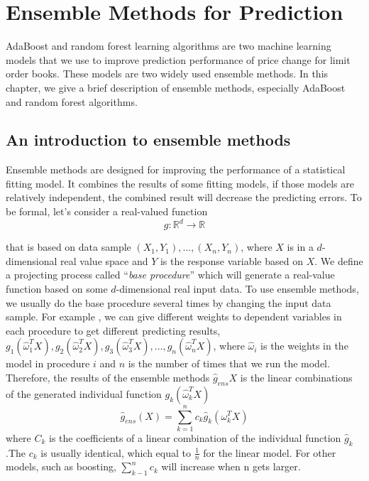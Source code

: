\chapter{Ensemble Methods for Prediction}\label{ch:ensemble}
AdaBoost and random forest learning algorithms are two machine learning models that we use to improve  prediction performance of price change for limit order books. These models are two widely used ensemble methods. In this chapter,  we give a brief description of ensemble methods, especially AdaBoost and random forest algorithms.

\section{An introduction to ensemble methods}
Ensemble methods are designed for improving the performance of a statistical fitting model. It combines the results of some fitting models,  if those models are relatively independent,  the combined result will decrease the predicting errors. 
To be formal,   let's consider a real-valued function 
\begin{equation}
	g:\mathbb{R}^d\rightarrow \mathbb{R}
\end{equation}

that is based on data sample $(X_1, Y_1), ..., (X_n, Y_n)$,  where $X$ is in a $d$-dimensional real value space and $Y$ is the response variable based on $X$. We define a projecting process called ``\textit{base procedure}'' which will generate a real-value function based on some $d$-dimensional real input data. To use ensemble methods,  we usually do the base procedure several times by changing the input data sample. For example ,  we can give different weights to dependent variables in each procedure to get different predicting results, ${g_1(\hat{\omega}_1^T X)}, {g_2(\hat{\omega}_2^T X)}, {g_3(\hat{\omega}_3^T X)}, ..., {g_n(\hat{\omega}_n^T X)}$,  where $\hat{\omega}_i$ is the weights in the model in procedure $i$ and $n$ is the number of times that we run the model. Therefore,  the results of the ensemble methods $\hat{g}_{ens}X$ is the linear combinations of the generated individual function ${g_k(\hat{\omega}_k^T X)}$
\begin{equation}
\hat{g}_{ens}(X)=\sum_{k=1}^{n}c_k\hat{g}_k(\omega_k^T X)
\end{equation}
where $C_k$ is the coefficients of a linear combination of the individual function $\hat{g}_k$.The $c_k$ is usually identical,  which equal to $\frac{1}{n}$ for the linear model. For other models, such as boosting,  $\sum_{k-1}^{n}c_k$ will increase when n gets larger.

